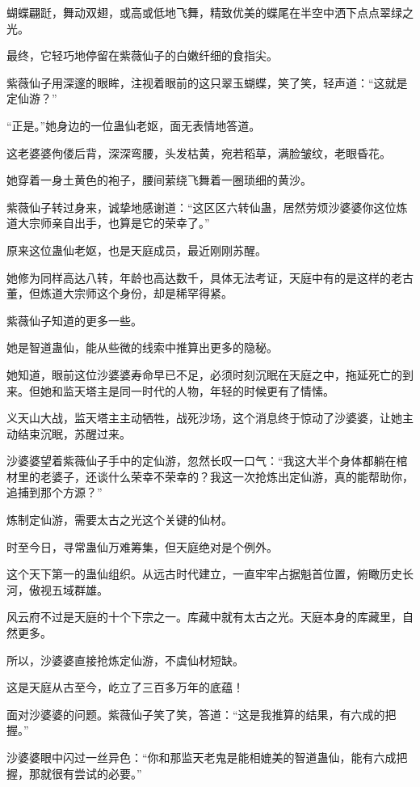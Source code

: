 
\begin{this_body}

蝴蝶翩跹，舞动双翅，或高或低地飞舞，精致优美的蝶尾在半空中洒下点点翠绿之光。

最终，它轻巧地停留在紫薇仙子的白嫩纤细的食指尖。

紫薇仙子用深邃的眼眸，注视着眼前的这只翠玉蝴蝶，笑了笑，轻声道：“这就是定仙游？”

“正是。”她身边的一位蛊仙老妪，面无表情地答道。

这老婆婆佝偻后背，深深弯腰，头发枯黄，宛若稻草，满脸皱纹，老眼昏花。

她穿着一身土黄色的袍子，腰间萦绕飞舞着一圈琐细的黄沙。

紫薇仙子转过身来，诚挚地感谢道：“这区区六转仙蛊，居然劳烦沙婆婆你这位炼道大宗师亲自出手，也算是它的荣幸了。”

原来这位蛊仙老妪，也是天庭成员，最近刚刚苏醒。

她修为同样高达八转，年龄也高达数千，具体无法考证，天庭中有的是这样的老古董，但炼道大宗师这个身份，却是稀罕得紧。

紫薇仙子知道的更多一些。

她是智道蛊仙，能从些微的线索中推算出更多的隐秘。

她知道，眼前这位沙婆婆寿命早已不足，必须时刻沉眠在天庭之中，拖延死亡的到来。但她和监天塔主是同一时代的人物，年轻的时候更有了情愫。

义天山大战，监天塔主主动牺牲，战死沙场，这个消息终于惊动了沙婆婆，让她主动结束沉眠，苏醒过来。

沙婆婆望着紫薇仙子手中的定仙游，忽然长叹一口气：“我这大半个身体都躺在棺材里的老婆子，还谈什么荣幸不荣幸的？我这一次抢炼出定仙游，真的能帮助你，追捕到那个方源？”

炼制定仙游，需要太古之光这个关键的仙材。

时至今日，寻常蛊仙万难筹集，但天庭绝对是个例外。

这个天下第一的蛊仙组织。从远古时代建立，一直牢牢占据魁首位置，俯瞰历史长河，傲视五域群雄。

风云府不过是天庭的十个下宗之一。库藏中就有太古之光。天庭本身的库藏里，自然更多。

所以，沙婆婆直接抢炼定仙游，不虞仙材短缺。

这是天庭从古至今，屹立了三百多万年的底蕴！

面对沙婆婆的问题。紫薇仙子笑了笑，答道：“这是我推算的结果，有六成的把握。”

沙婆婆眼中闪过一丝异色：“你和那监天老鬼是能相媲美的智道蛊仙，能有六成把握，那就很有尝试的必要。”


\end{this_body}
